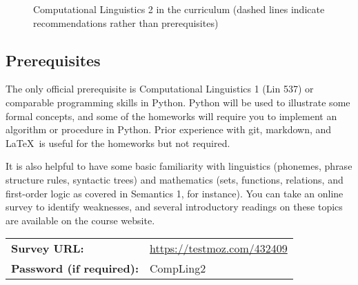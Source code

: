 \begin{figure}
\caption{Computational Linguistics 2 in the curriculum (dashed lines indicate recommendations rather than prerequisites)}
\label{fig:Syllabus_Program}
\end{figure}    

\subsection{Prerequisites}

The only official prerequisite is Computational Linguistics 1 (Lin 537) or comparable programming skills in Python.
Python will be used to illustrate some formal concepts, and some of the homeworks will require you to implement an algorithm or procedure in Python.
Prior experience with git, markdown, and \LaTeX\ is useful for the homeworks but not required.

It is also helpful to have some basic familiarity with linguistics (phonemes, phrase structure rules, syntactic trees) and mathematics (sets, functions, relations, and first-order logic as covered in Semantics 1, for instance).
You can take an online survey to identify weaknesses, and several introductory readings on these topics are available on the course website.

\medskip
\noindent
\hspace{-.75em}
\begin{tabular}{ll}
    \textbf{Survey URL:} & 
    \href{https://testmoz.com/432409}{https://testmoz.com/432409}\\
    \textbf{Password (if required):} &
    CompLing2
\end{tabular}

